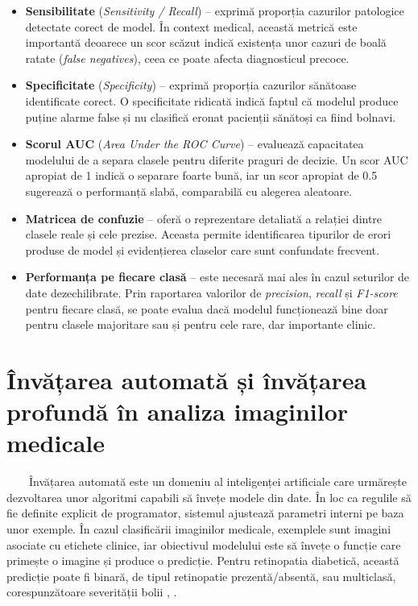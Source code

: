 \documentclass[12pt, a4paper, twoside, romanian]{teza-upb}
\begin{document}
\begin{itemize}
  \item \textbf{Sensibilitate} (\textit{Sensitivity / Recall}) -- exprimă proporția cazurilor patologice detectate corect de model.
   În context medical, această metrică este importantă deoarece un scor scăzut indică existența unor cazuri de boală ratate 
   (\textit{false negatives}), ceea ce poate afecta diagnosticul precoce.

  \item \textbf{Specificitate} (\textit{Specificity}) -- exprimă proporția cazurilor sănătoase identificate corect.
   O specificitate ridicată indică faptul că modelul produce puține alarme false și nu clasifică eronat pacienții sănătoși ca fiind bolnavi.

  \item \textbf{Scorul AUC} (\textit{Area Under the ROC Curve}) -- evaluează capacitatea modelului de a separa clasele 
  pentru diferite praguri de decizie. Un scor AUC apropiat de 1 indică o separare foarte bună, iar un scor apropiat de 
  0.5 sugerează o performanță slabă, comparabilă cu alegerea aleatoare.

  \item \textbf{Matricea de confuzie} -- oferă o reprezentare detaliată a relației dintre clasele reale și cele prezise. 
  Aceasta permite identificarea tipurilor de erori produse de model și evidențierea claselor care sunt confundate frecvent.

  \item \textbf{Performanța pe fiecare clasă} -- este necesară mai ales în cazul seturilor de date dezechilibrate.
   Prin raportarea valorilor de \textit{precision}, \textit{recall} și \textit{F1-score} pentru fiecare clasă, se poate
    evalua dacă modelul funcționează bine doar pentru clasele majoritare sau și pentru cele rare, dar importante clinic.
\end{itemize}

\section{Învățarea automată și învățarea profundă în analiza imaginilor medicale}

\ \ \ \ Învățarea automată este un domeniu al inteligenței artificiale care urmărește dezvoltarea unor
algoritmi capabili să învețe modele din date. În loc ca regulile să
fie definite explicit de programator, sistemul ajustează parametri interni pe baza unor
exemple. În cazul clasificării imaginilor medicale, exemplele sunt imagini asociate cu etichete
clinice, iar obiectivul modelului este să învețe o funcție care primește o
imagine și produce o predicție. Pentru retinopatia diabetică, această predicție poate fi
binară, de tipul retinopatie prezentă/absentă, sau multiclasă, corespunzătoare severității bolii \cite{3_gulshan2016development}, \cite{15_li2019diagnostic}.
\bigskip
\end{document}
